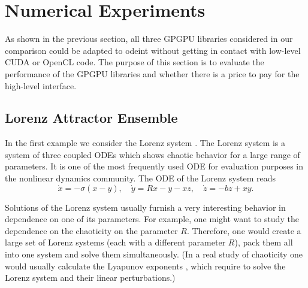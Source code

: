 \documentclass[final]{siamltex}
\begin{document}
%
%
\section{Numerical Experiments}

As shown in the previous section, all three GPGPU libraries considered
in our comparison could be adapted to odeint without getting in
contact with low-level CUDA or OpenCL code.  The purpose of this
section is to evaluate the performance of the GPGPU libraries and
whether there is a price to pay for the high-level interface.






%
%

\subsection{Lorenz Attractor Ensemble}

In the first example we consider the Lorenz system \cite{Lorenz-63}. The
Lorenz system is a system of three coupled ODEs which shows chaotic
behavior for a large range of parameters. It is one of the most frequently
used ODE for evaluation purposes in the nonlinear dynamics community.   %
The ODE of the Lorenz system reads
\begin{equation}
    \dot{x} = -\sigma \left( x - y \right), \quad
    \dot{y} = R x - y - xz, \quad
    \dot{z} = -bz + xy.
    \label{eq:lorenz}
\end{equation}


Solutions of the Lorenz system usually furnish a very interesting
behavior in dependence on one of its parameters.  For example, one
might want to study the dependence on the chaoticity on the parameter
$R$. Therefore, one would create a large set of Lorenz systems (each
with a different parameter $R$), pack them all into one system and
solve them simultaneously. (In a real study of chaoticity one would
usually calculate the Lyapunov exponents \cite{Ott-book-02}, which
require to solve the Lorenz system and their linear perturbations.)

\end{document}
